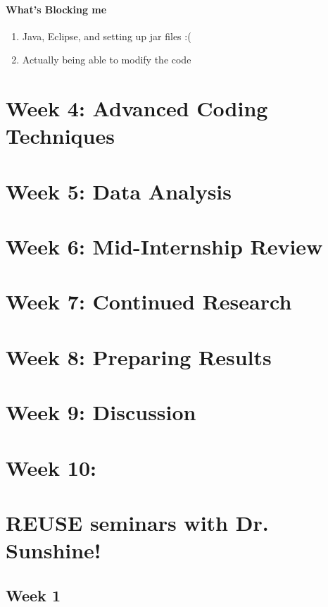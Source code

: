 \documentclass[11pt]{article}
\begin{document}
\paragraph[short]{What's Blocking me}{
  \begin{enumerate}
    \item Java, Eclipse, and setting up jar files :(\
    \item Actually being able to modify the code
  \end{enumerate}
}



\section{Week 4: Advanced Coding Techniques}
\lipsum[5]

\section{Week 5: Data Analysis}

\section{Week 6: Mid-Internship Review}


\section{Week 7: Continued Research}


\section{Week 8: Preparing Results}


\section{Week 9: Discussion}


\section{Week 10: }

\section{REUSE seminars with Dr. Sunshine!}
\subsection{Week 1}
\end{document}
